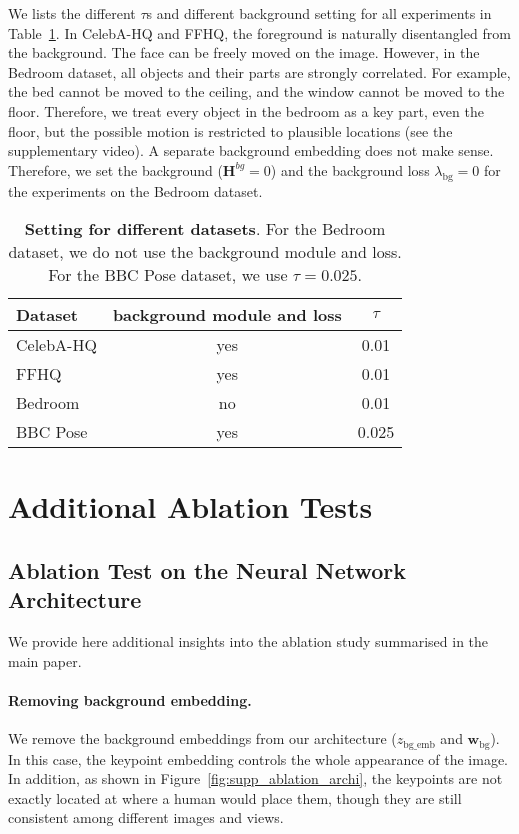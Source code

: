 \documentclass[10pt, conference, compsocconf]{IEEEtran}
\newcommand{\vw}{\mathbf{w}}
\newcommand{\mH}{\mathbf{H}}
\begin{document}
We lists the different $\tau$s and different background setting for all experiments in Table~\ref{tab:setting_datasets}.  In CelebA-HQ and FFHQ, the foreground is naturally disentangled from the background. The face can be freely moved on the image. However, in the Bedroom dataset, all objects and their parts are strongly correlated.
For example, the bed cannot be moved to the ceiling, and the window cannot be moved to the floor. Therefore, we treat every object in the bedroom as a key part, even the floor, but the possible motion is restricted to plausible locations (see the supplementary video). A separate background embedding does not make sense. Therefore, we set the background ($\mH^{bg}=0$) and the background loss $\lambda_\text{bg}=0$ for the experiments on the Bedroom dataset.

\begin{table}
\begin{center}
\begin{tabular}{|l|c|c|}
\hline
Dataset & background module and loss & $\tau$\\ 
\hline
CelebA-HQ & yes & 0.01\\ 
FFHQ & yes & 0.01\\ 
Bedroom & no & 0.01\\
BBC Pose & yes & 0.025\\  \hline
\end{tabular}
\end{center}
\caption{\textbf{Setting for different datasets}. For the Bedroom dataset, we do not use the background module and loss. For the BBC Pose dataset, we use $\tau=0.025$.}
\label{tab:setting_datasets}
\end{table} \section{Additional Ablation Tests} \label{sec:ablation_test}

\subsection{Ablation Test on the Neural Network Architecture}

We provide here additional insights into the ablation study summarised in the main paper.


\paragraph{Removing background embedding.} We remove the background embeddings from our architecture ($z_\text{bg\_emb}$ and $\vw_\text{bg}$). In this case, the keypoint embedding controls the whole appearance of the image. In addition, as shown in Figure~\ref{fig:supp_ablation_archi}, the keypoints are not exactly located at where a human would place them, though they are still consistent among different images and views.
\end{document}
